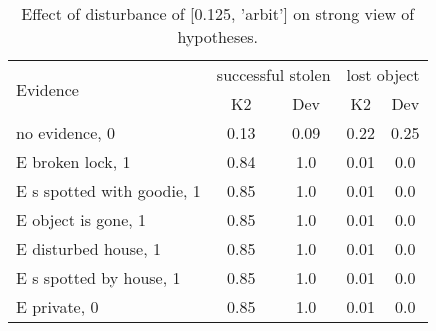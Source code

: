 \begin{table}\begin{tabular}{l|cc|cc}\toprule\multirow{2}{*}{Evidence} & \multicolumn{2}{c}{successful stolen}& \multicolumn{2}{c}{lost object}\\& {K2} & {Dev}& {K2} & {Dev}\\\midrule
no evidence, 0 & 0.13&0.09&0.22&0.25\\E broken lock, 1 & \cellcolor{Bittersweet}0.84&\cellcolor{Bittersweet}1.0&0.01&0.0\\E s spotted with goodie, 1 & \cellcolor{Bittersweet}0.85&\cellcolor{Bittersweet}1.0&0.01&0.0\\E object is gone, 1 & \cellcolor{Bittersweet}0.85&\cellcolor{Bittersweet}1.0&0.01&0.0\\E disturbed house, 1 & \cellcolor{Bittersweet}0.85&\cellcolor{Bittersweet}1.0&0.01&0.0\\E s spotted by house, 1 & \cellcolor{Bittersweet}0.85&\cellcolor{Bittersweet}1.0&0.01&0.0\\E private, 0 & \cellcolor{Bittersweet}0.85&\cellcolor{Bittersweet}1.0&0.01&0.0\\\bottomrule\end{tabular}\caption{Effect of disturbance of [0.125, 'arbit'] on strong view of hypotheses.}\end{table}